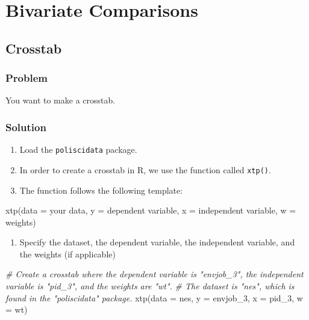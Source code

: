 \documentclass[
]{book}
\newenvironment{Shaded}{\begin{snugshade}}{\end{snugshade}}
\newcommand{\AttributeTok}[1]{\textcolor[rgb]{0.77,0.63,0.00}{#1}}
\newcommand{\CommentTok}[1]{\textcolor[rgb]{0.56,0.35,0.01}{\textit{#1}}}
\newcommand{\FunctionTok}[1]{\textcolor[rgb]{0.00,0.00,0.00}{#1}}
\newcommand{\NormalTok}[1]{#1}
\providecommand{\tightlist}{%
  \setlength{\itemsep}{0pt}\setlength{\parskip}{0pt}}
\begin{document}
\hypertarget{bivariate-comparisons}{%
\chapter{Bivariate Comparisons}\label{bivariate-comparisons}}

\hypertarget{crosstab}{%
\section{Crosstab}\label{crosstab}}

\hypertarget{problem-13}{%
\subsection{Problem}\label{problem-13}}

You want to make a crosstab.

\hypertarget{solution-13}{%
\subsection{Solution}\label{solution-13}}

\begin{enumerate}
\def\labelenumi{\arabic{enumi}.}
\tightlist
\item
  Load the \texttt{poliscidata} package.
\item
  In order to create a crosstab in R, we use the function called \texttt{xtp()}.\\
\item
  The function follows the following template:
\end{enumerate}

\begin{Shaded}
\begin{Highlighting}[]
\FunctionTok{xtp}\NormalTok{(}\AttributeTok{data =}\NormalTok{ your data, }\AttributeTok{y =}\NormalTok{ dependent variable, }\AttributeTok{x =}\NormalTok{ independent variable, }\AttributeTok{w =}\NormalTok{ weights)}
\end{Highlighting}
\end{Shaded}

\begin{enumerate}
\def\labelenumi{\arabic{enumi}.}
\tightlist
\item
  Specify the dataset, the dependent variable, the independent variable, and the weights (if applicable)
\end{enumerate}

\begin{Shaded}
\begin{Highlighting}[]
\CommentTok{\# Create a crosstab where the dependent variable is "envjob\_3", the independent variable is "pid\_3", and the weights are "wt".}
\CommentTok{\# The dataset is "nes", which is found in the "poliscidata" package.}
\FunctionTok{xtp}\NormalTok{(}\AttributeTok{data =}\NormalTok{ nes, }\AttributeTok{y =}\NormalTok{ envjob\_3, }\AttributeTok{x =}\NormalTok{ pid\_3, }\AttributeTok{w =}\NormalTok{ wt)}
\end{Highlighting}
\end{Shaded}
\end{document}
